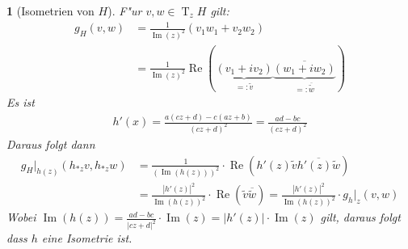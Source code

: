 \documentclass[paper=A4, twoside, chapterprefix=true, bibliography=totoc, headsepline]{scrbook}
\DeclareMathOperator{\T}{T}         %
\renewcommand{\Re}{\ensuremath{\operatorname{Re}}}
\renewcommand{\Im}{\ensuremath{\operatorname{Im}}}
\theoremstyle{plain}
\theoremstyle{nonumberplain}
\theoremstyle{empty}
\newtheorem{emptythm}{}%
\theoremstyle{break}
\begin{document}
\begin{emptythm}[Isometrien von $H$]
F"ur $v, w \in \T_zH$ gilt:
\begin{align*}
	g_H(v, w) &= \frac{1}{\Im(z)^2} (v_1 w_1 + v_2 w_2) \\
	&= \frac{1}{\Im(z)^2} \Re(\underbrace{(v_1 + iv_2)}_{=: \tilde{v}} \overline{\underbrace{(w_1 + i w_2)}_{=:\overline{\tilde{w}}}})
\end{align*}
Es ist
\begin{align*}
	h'(x) = \frac{a(cz + d) - c(az + b)}{(cz + d)^2} = \frac{ad - bc}{(cz + d)^2}
\end{align*}
Daraus folgt dann
\begin{align*}
	g_H|_{h(z)}(h_{*z}v, h_{*z}w) &= \frac{1}{(\Im(h(z)))^2} \cdot \Re(h'(z) \tilde{v} \overline{h'(z) \tilde{w}}) \\
	&= \frac{|h'(z)|^2}{\Im(h(z))^2} \cdot \Re(\tilde{v} \overline{\tilde{w}}) = \frac{|h'(z)|^2}{\Im(h(z))^2} \cdot g_h|_z(v,w)
\end{align*}
Wobei $\Im(h(z)) = \frac{ad - bc}{|cz + d|^2} \cdot \Im(z) = |h'(z)| \cdot \Im(z)$ gilt, daraus folgt dass $h$ eine Isometrie ist.
\end{emptythm}
\end{document}
